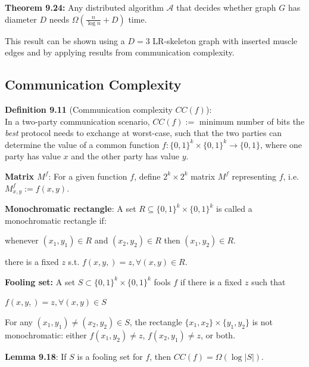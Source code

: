 \documentclass[a4paper, 8pt, landscape]{scrartcl}
\begin{document}
\begin{multicols*}{3}
\textbf{Theorem 9.24:} Any distributed algorithm $\mathcal{A}$ that decides whether graph $G$ has diameter $D$ needs $\Omega(\frac{n}{\log n} + D)$ time.

This result can be shown using a $D=3$ LR-skeleton graph with inserted muscle edges and by applying results from communication complexity.


\subsection{Communication Complexity}

\textbf{Definition 9.11} (Communication complexity $CC(f)$):\\
In a two-party communication scenario, $CC(f) :=$ minimum number of bits the \textit{best} protocol needs to exchange at worst-case, such that the two parties can determine the value of a common function $f: \{0,1\}^k \times \{0,1\}^k \rightarrow \{0,1\}$, where one party has value $x$ and the other party has value $y$. 

\textbf{Matrix $M^f$}: For a given function $f$, define $2^k \times 2^k$ matrix $M^f$ representing $f$, i.e. $M_{x,y}^f := f(x,y)$.

\textbf{Monochromatic rectangle}: A set $R \subseteq \{0,1\}^k \times \{0,1\}^k$ is called a monochromatic rectangle if:

\vspace*{-1mm}
\begin{compactitem}
\item whenever $(x_1, y_1) \in R$ and $(x_2, y_2) \in R$ then $(x_1, y_2) \in R$.
\item there is a fixed $z$ s.t. $f(x,y,) = z, \forall (x,y) \in R$.
\end{compactitem}

\textbf{Fooling set:} A set $S \subset \{0,1\}^k \times \{0,1\}^k$ fools $f$ if there is a fixed $z$ such that

\vspace*{-1mm}
\begin{compactitem}
\item $f(x,y,) = z, \forall (x,y) \in S$
\item For any $(x_1, y_1) \neq (x_2, y_2) \in S$, the rectangle $\{x_1, x_2\} \times \{y_1, y_2\}$ is not monochromatic: either $f(x_1, y_2) \neq z$, $f(x_2, y_1) \neq z$, or both.
\end{compactitem}
\vspace*{-1mm}

\textbf{Lemma 9.18}: If $S$ is a fooling set for $f$, then $CC(f) = \Omega(\log |S|)$.


\end{multicols*}
\end{document}
